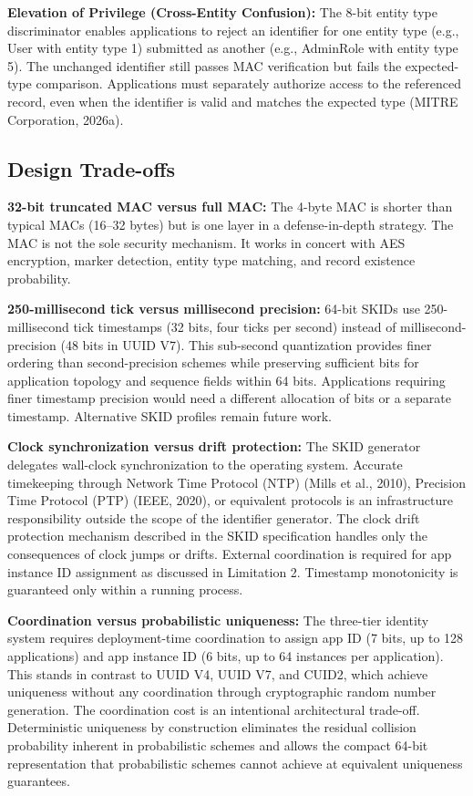 \documentclass[fleqn,10pt,lineno]{wlpeerj}
\begin{document}
\textbf{Elevation of Privilege (Cross-Entity Confusion):} The 8-bit
entity type discriminator enables applications to reject an identifier
for one entity type (e.g., User with entity type 1) submitted as another
(e.g., AdminRole with entity type 5). The unchanged identifier still
passes MAC verification but fails the expected-type comparison.
Applications must separately authorize access to the referenced record,
even when the identifier is valid and matches the expected type (MITRE
Corporation, 2026a).

\subsection{Design Trade-offs}\label{design-trade-offs}

\textbf{32-bit truncated MAC versus full MAC:} The 4-byte MAC is shorter
than typical MACs (16--32 bytes) but is one layer in a defense-in-depth
strategy. The MAC is not the sole security mechanism. It works in
concert with AES encryption, marker detection, entity type matching, and
record existence probability.

\textbf{250-millisecond tick versus millisecond precision:} 64-bit SKIDs
use 250-millisecond tick timestamps (32 bits, four ticks per second)
instead of millisecond-precision (48 bits in UUID V7). This sub-second
quantization provides finer ordering than second-precision schemes while
preserving sufficient bits for application topology and sequence fields
within 64 bits. Applications requiring finer timestamp precision would
need a different allocation of bits or a separate timestamp. Alternative
SKID profiles remain future work.

\textbf{Clock synchronization versus drift protection:} The SKID
generator delegates wall-clock synchronization to the operating system.
Accurate timekeeping through Network Time Protocol (NTP) (Mills et al.,
2010), Precision Time Protocol (PTP) (IEEE, 2020), or equivalent
protocols is an infrastructure responsibility outside the scope of the
identifier generator. The clock drift protection mechanism described in
the SKID specification handles only the consequences of clock jumps or
drifts. External coordination is required for app instance ID assignment
as discussed in Limitation 2. Timestamp monotonicity is guaranteed only
within a running process.

\textbf{Coordination versus probabilistic uniqueness:} The three-tier
identity system requires deployment-time coordination to assign app ID
(7 bits, up to 128 applications) and app instance ID (6 bits, up to 64
instances per application). This stands in contrast to UUID V4, UUID V7,
and CUID2, which achieve uniqueness without any coordination through
cryptographic random number generation. The coordination cost is an
intentional architectural trade-off. Deterministic uniqueness by
construction eliminates the residual collision probability inherent in
probabilistic schemes and allows the compact 64-bit representation that
probabilistic schemes cannot achieve at equivalent uniqueness
guarantees.
\end{document}
